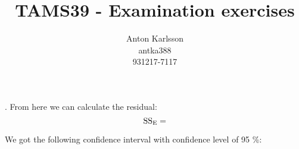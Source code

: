 \message{ !name(examination.tex)}\documentclass[one column]{report}
\title{TAMS39 - Examination exercises}
\author{Anton Karlsson\\antka388\\931217-7117}
\date{}
\begin{document}
. From here we
can calculate the residual:
\begin{equation*}
  \text{SS}_{\rm E} = 
\end{equation*}

We got the following confidence interval with confidence level of 95
\%: 
\end{document}

